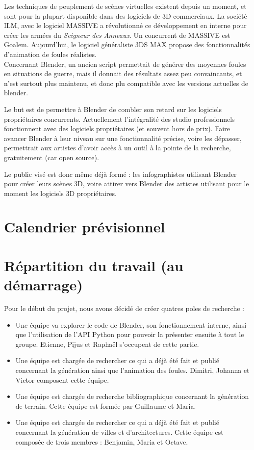 \documentclass[a4paper,12pt]{article}
\begin{document}
Les techniques de peuplement de scènes virtuelles existent depuis un moment, et sont pour la plupart disponible dans des logiciels de 3D commerciaux. La société ILM, avec le logiciel MASSIVE\cite{Massive} a révolutionné ce développement en interne pour créer les armées du \textit{Seigneur des Anneaux}. Un concurrent de MASSIVE est Goalem\cite{Golaem}. Aujourd'hui, le logiciel généraliste 3DS MAX\cite{3dsmax} propose des fonctionnalités d'animation de foules réalistes. \\
Concernant Blender, un ancien script permettait de générer des moyennes foules en situations de guerre, mais il donnait des résultats assez peu convaincants, et n'est surtout plus maintenu, et donc plu compatible avec les versions actuelles de blender.

Le but est de permettre à Blender de combler son retard sur les logiciels propriétaires concurrents. Actuellement l'intégralité des studio professionnels fonctionnent avec des logiciels propriétaires (et souvent hors de prix). Faire avancer Blender à leur niveau sur une fonctionnalité précise, voire les dépasser, permettrait aux artistes d'avoir accès à un outil à la pointe de la recherche, gratuitement (car open source).

Le public visé est donc même déjà formé : les infographistes utilisant Blender pour créer leurs scènes 3D, voire attirer vers Blender des artistes utilisant pour le moment les logiciels 3D propriétaires.

\section{Calendrier prévisionnel}

\section{Répartition du travail (au démarrage)}

Pour le début du projet, nous avons décidé de créer quatres poles de recherche :
\begin{itemize}
\item Une équipe va explorer le code de Blender, son fonctionnement interne, ainsi que l'utilisation de l'API Python pour pouvoir la présenter ensuite à tout le groupe. Etienne, Pijus et Raphaël s'occupent de cette partie. 
\item Une équipe est chargée de rechercher ce qui a déjà été fait et publié concernant la génération ainsi que l'animation des foules. Dimitri, Johanna et Victor composent cette équipe.
\item Une équipe est chargée de recherche bibliographique concernant la génération de terrain. Cette équipe est formée par Guillaume et Maria.
\item Une équipe est chargée de rechercher ce qui a déjà été fait et publié concernant la génération de villes et d'architectures. Cette équipe est composée de trois membres : Benjamin, Maria et Octave.
\end{itemize}
\end{document}
